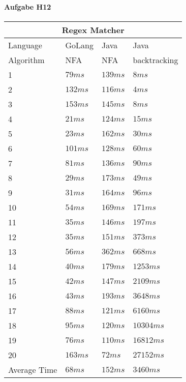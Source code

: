 \documentclass[11pt]{article}
\begin{document}
\paragraph{Aufgabe H12}
\begin{center}
\begin{tabular}{ |p{3cm}||p{2cm}|p{2cm}|p{2cm}|  }
 \hline
 \multicolumn{4}{|c|}{Regex Matcher} \\
 \hline
 Language & GoLang & Java & Java\\
 \hline
 Algorithm & NFA & NFA & backtracking\\
 \hline
 1	&	$79 ms$	&	$139 ms$	&	$8 ms$\\
 2	&	$132 ms$	&	$116 ms$	&	$4 ms$\\
 3	&	$153 ms$	&	$145 ms$	&	$8 ms$\\
 4	&	$21 ms$	&	$124 ms$	&	$15 ms$\\
 5	&	$23 ms$	&	$162 ms$	&	$30 ms$\\
 6	&	$101 ms$	&	$128 ms$	&	$60 ms$\\
 7	&	$81 ms$	&	$136 ms$	&	$90 ms$\\
 8	&	$29 ms$	&	$173 ms$	&	$49 ms$\\
 9	&	$31 ms$	&	$164 ms$	&	$96 ms$\\
 10	&	$54 ms$	&	$169 ms$	&	$171 ms$\\
 11	&	$35 ms$	&	$146 ms$	&	$197 ms$\\
 12	&	$35 ms$	&	$151 ms$	&	$373 ms$\\
 13	&	$56 ms$	&	$362 ms$	&	$668 ms$\\
 14	&	$40 ms$	&	$179 ms$	&	$1253 ms$\\
 15	&	$42 ms$	&	$147 ms$	&	$2109 ms$\\
 16	&	$43 ms$	&	$193 ms$	&	$3648 ms$\\
 17	&	$88 ms$	&	$121 ms$	&	$6160 ms$\\
 18	&	$95 ms$	&	$120 ms$	&	$10304 ms$\\
 19	&	$76 ms$	&	$110 ms$	&	$16812 ms$\\
 20	&	$163 ms$	&	$72 ms$	&	$27152 ms$\\
 \hline
 Average Time	&	$68 ms$	&	$152 ms$	&	$3460 ms$\\
 \hline
\end{tabular}
\end{center}
\end{document}
